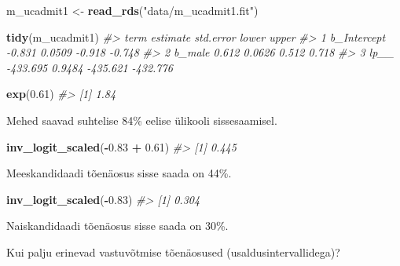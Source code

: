 \documentclass[]{book}
\newenvironment{Shaded}{\begin{snugshade}}{\end{snugshade}}
\newcommand{\KeywordTok}[1]{\textcolor[rgb]{0.13,0.29,0.53}{\textbf{#1}}}
\newcommand{\FloatTok}[1]{\textcolor[rgb]{0.00,0.00,0.81}{#1}}
\newcommand{\StringTok}[1]{\textcolor[rgb]{0.31,0.60,0.02}{#1}}
\newcommand{\CommentTok}[1]{\textcolor[rgb]{0.56,0.35,0.01}{\textit{#1}}}
\newcommand{\OperatorTok}[1]{\textcolor[rgb]{0.81,0.36,0.00}{\textbf{#1}}}
\newcommand{\NormalTok}[1]{#1}
\begin{document}
\begin{Shaded}
\begin{Highlighting}[]
\NormalTok{m_ucadmit1 <-}\StringTok{ }\KeywordTok{read_rds}\NormalTok{(}\StringTok{"data/m_ucadmit1.fit"}\NormalTok{)}
\end{Highlighting}
\end{Shaded}

\begin{Shaded}
\begin{Highlighting}[]
\KeywordTok{tidy}\NormalTok{(m_ucadmit1)}
\CommentTok{#>          term estimate std.error    lower    upper}
\CommentTok{#> 1 b_Intercept   -0.831    0.0509   -0.918   -0.748}
\CommentTok{#> 2      b_male    0.612    0.0626    0.512    0.718}
\CommentTok{#> 3        lp__ -433.695    0.9484 -435.621 -432.776}
\end{Highlighting}
\end{Shaded}

\begin{Shaded}
\begin{Highlighting}[]
\KeywordTok{exp}\NormalTok{(}\FloatTok{0.61}\NormalTok{)}
\CommentTok{#> [1] 1.84}
\end{Highlighting}
\end{Shaded}

Mehed saavad suhtelise 84\% eelise ülikooli sissesaamisel.

\begin{Shaded}
\begin{Highlighting}[]
\KeywordTok{inv_logit_scaled}\NormalTok{(}\OperatorTok{-}\FloatTok{0.83} \OperatorTok{+}\StringTok{ }\FloatTok{0.61}\NormalTok{)}
\CommentTok{#> [1] 0.445}
\end{Highlighting}
\end{Shaded}

Meeskandidaadi tõenäosus sisse saada on 44\%.

\begin{Shaded}
\begin{Highlighting}[]
\KeywordTok{inv_logit_scaled}\NormalTok{(}\OperatorTok{-}\FloatTok{0.83}\NormalTok{)}
\CommentTok{#> [1] 0.304}
\end{Highlighting}
\end{Shaded}

Naiskandidaadi tõenäosus sisse saada on 30\%.

Kui palju erinevad vastuvõtmise tõenäosused (usaldusintervallidega)?
\end{document}

